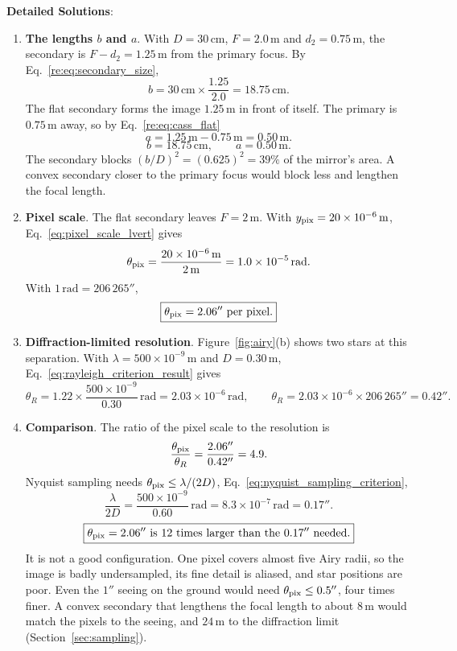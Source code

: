\textbf{Detailed Solutions}:
\begin{enumerate}[label=(\alph*)]
	\item \textbf{The lengths $b$ and $a$}. With $D=30\,\mathrm{cm}$, $F=2.0\,\mathrm m$ and $d_2=0.75\,\mathrm m$, the secondary is $F-d_2=1.25\,\mathrm m$ from the primary focus. By Eq.~\eqref{re:eq:secondary_size},
	\[
	b=30\,\mathrm{cm}\times\frac{1.25}{2.0}=18.75\,\mathrm{cm}.
	\]
	The flat secondary forms the image $1.25\,\mathrm m$ in front of itself. The primary is $0.75\,\mathrm m$ away, so by Eq.~\eqref{re:eq:cass_flat}
	\[
	a=1.25\,\mathrm m-0.75\,\mathrm m=0.50\,\mathrm m .
	\]
	\[
	\boxed{b=18.75\,\mathrm{cm},\qquad a=0.50\,\mathrm m .}
	\]
	The secondary blocks $(b/D)^2=(0.625)^2=39\%$ of the mirror's area. A convex secondary closer to the primary focus would block less and lengthen the focal length.

	\item \textbf{Pixel scale}. The flat secondary leaves $F=2\,\mathrm m$. With $y_{\rm pix}=20\times10^{-6}\,\mathrm m$, Eq.~\eqref{eq:pixel_scale_lvert} gives
	\[
	\theta_{\rm pix}=\frac{20\times10^{-6}\,\mathrm m}{2\,\mathrm m}=1.0\times10^{-5}\,\mathrm{rad}.
	\]
	With $1\,\mathrm{rad}=206\,265''$,
	\[
	\boxed{\theta_{\rm pix}=2.06''\ \text{per pixel}.}
	\]

	\item \textbf{Diffraction-limited resolution}. Figure~\ref{fig:airy}(b) shows two stars at this separation.
	With $\lambda=500\times10^{-9}\,\mathrm m$ and $D=0.30\,\mathrm m$, Eq.~\eqref{eq:rayleigh_criterion_result} gives
	\[
	\theta_R=1.22\times\frac{500\times10^{-9}}{0.30}\,\mathrm{rad}=2.03\times10^{-6}\,\mathrm{rad},
	\qquad
	\boxed{\theta_R=2.03\times10^{-6}\times206\,265''=0.42''.}
	\]

	\item \textbf{Comparison}.
	The ratio of the pixel scale to the resolution is
	\[
	\frac{\theta_{\rm pix}}{\theta_R}=\frac{2.06''}{0.42''}=4.9 .
	\]
	Nyquist sampling needs $\theta_{\rm pix}\le\lambda/(2D)$, Eq.~\eqref{eq:nyquist_sampling_criterion},
	\[
	\frac{\lambda}{2D}=\frac{500\times10^{-9}}{0.60}\,\mathrm{rad}=8.3\times10^{-7}\,\mathrm{rad}=0.17''.
	\]
	\[
	\boxed{\theta_{\rm pix}=2.06''\ \text{is}\ 12\ \text{times larger than the}\ 0.17''\ \text{needed}.}
	\]
	It is not a good configuration. One pixel covers almost five Airy radii, so the image is badly undersampled, its fine detail is aliased, and star positions are poor. Even the $1''$ seeing on the ground would need $\theta_{\rm pix}\le0.5''$, four times finer. A convex secondary that lengthens the focal length to about $8\,\mathrm m$ would match the pixels to the seeing, and $24\,\mathrm m$ to the diffraction limit (Section~\ref{sec:sampling}).
\end{enumerate}

